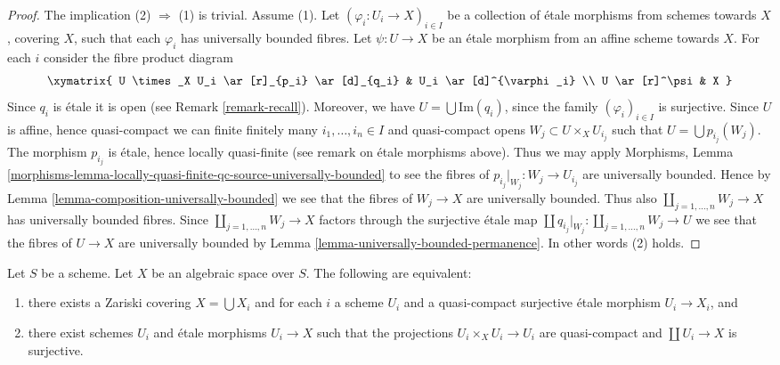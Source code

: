 \begin{proof}
The implication (2) $\Rightarrow$ (1) is trivial.
Assume (1). Let $(\varphi_i : U_i \to X)_{i \in I}$ be a collection of
\'etale morphisms from schemes towards $X$, covering $X$, such that
each $\varphi_i$ has universally bounded fibres.
Let $\psi : U \to X$ be an \'etale morphism from an affine scheme towards $X$.
For each $i$ consider the fibre product diagram
$$
\xymatrix{
U \times_X U_i \ar[r]_{p_i} \ar[d]_{q_i} & U_i \ar[d]^{\varphi_i} \\
U \ar[r]^\psi & X
}
$$
Since $q_i$ is \'etale it is open (see Remark \ref{remark-recall}).
Moreover, we have $U = \bigcup \text{Im}(q_i)$, since the family
$(\varphi_i)_{i \in I}$ is surjective. Since $U$ is affine, hence quasi-compact
we can finite finitely many $i_1, \ldots, i_n \in I$ and quasi-compact
opens $W_j \subset U \times_X U_{i_j}$ such that
$U = \bigcup p_{i_j}(W_j)$.
The morphism $p_{i_j}$ is \'etale, hence locally quasi-finite
(see remark on \'etale morphisms above). Thus we may apply
Morphisms, Lemma
\ref{morphisms-lemma-locally-quasi-finite-qc-source-universally-bounded}
to see the fibres of $p_{i_j}|_{W_j} : W_j \to U_{i_j}$ are universally
bounded. Hence by
Lemma \ref{lemma-composition-universally-bounded}
we see that the fibres of $W_j \to X$ are universally bounded.
Thus also $\coprod_{j = 1, \ldots, n} W_j \to X$ has universally
bounded fibres. Since $\coprod_{j = 1, \ldots, n} W_j \to X$ factors
through the surjective \'etale map
$\coprod q_{i_j}|_{W_j} : \coprod_{j = 1, \ldots, n} W_j \to U$ we
see that the fibres of $U \to X$ are universally bounded by
Lemma \ref{lemma-universally-bounded-permanence}.
In other words (2) holds.
\end{proof}

\begin{lemma}
\label{lemma-characterize-very-reasonable}
Let $S$ be a scheme.
Let $X$ be an algebraic space over $S$.
The following are equivalent:
\begin{enumerate}
\item there exists a Zariski covering $X = \bigcup X_i$ and for
each $i$ a scheme $U_i$ and a quasi-compact surjective \'etale
morphism $U_i \to X_i$, and
\item there exist schemes $U_i$ and \'etale morphisms $U_i \to X$
such that the projections $U_i \times_X U_i \to U_i$ are quasi-compact
and $\coprod U_i \to X$ is surjective.
\end{enumerate}
\end{lemma}

